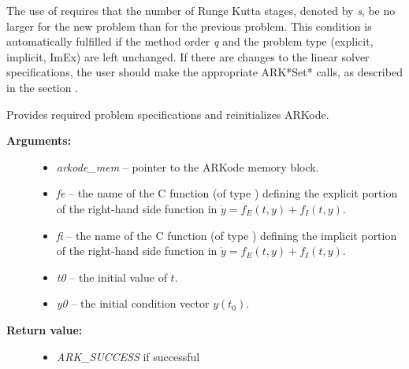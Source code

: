 \documentclass[letterpaper,10pt,english]{sphinxmanual}
\begin{document}
The use of {\hyperref[c_interface/User_callable:c.ARKodeReInit]{\emph{}}} requires that the number of Runge
Kutta stages, denoted by \emph{s}, be no larger for the new problem than
for the previous problem.  This condition is automatically fulfilled
if the method order \emph{q} and the problem type (explicit, implicit,
ImEx) are left unchanged.  If there are changes to the linear solver
specifications, the user should make the appropriate ARK*Set* calls,
as described in the section {\hyperref[c_interface/User_callable:cinterface-linearsolvers]{\emph{}}}.

\begin{fulllineitems}
\label{c_interface/User_callable:c.ARKodeReInit}
Provides required problem specifications and reinitializes ARKode.
\begin{description}
\item[{\textbf{Arguments:}}] \leavevmode\begin{itemize}
\item {} 
\emph{arkode\_mem} -- pointer to the ARKode memory block.

\item {} 
\emph{fe} -- the name of the C function (of type {\hyperref[c_interface/User_supplied:c.ARKRhsFn]{\emph{}}})
defining the explicit portion of the right-hand side function in
\(\dot{y} = f_E(t,y) + f_I(t,y)\).

\item {} 
\emph{fi} -- the name of the C function (of type {\hyperref[c_interface/User_supplied:c.ARKRhsFn]{\emph{}}})
defining the implicit portion of the right-hand side function in
\(\dot{y} = f_E(t,y) + f_I(t,y)\).

\item {} 
\emph{t0} -- the initial value of \(t\).

\item {} 
\emph{y0} -- the initial condition vector \(y(t_0)\).

\end{itemize}

\item[{\textbf{Return value:}}] \leavevmode\begin{itemize}
\item {} 
\emph{ARK\_SUCCESS} if successful


\end{itemize}
\end{description}
\end{fulllineitems}
\end{document}
